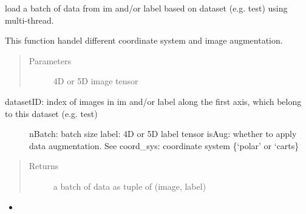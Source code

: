 \documentclass[letterpaper,10pt,english]{sphinxmanual}
\begin{document}

\begin{fulllineitems}
\label{\detokenize{index:util.load_batch.load_batch_parallel}}
load a batch of data from im and/or label based on dataset (e.g. test) using multi-thread.

This function handel different coordinate system and image augmentation.
\begin{quote}\begin{description}
\item[{Parameters}] \leavevmode
{} \textendash{} 4D or 5D image tensor

\end{description}\end{quote}
\begin{description}
\item[{datasetID: index of images in im and/or label along the first axis, which belong to this dataset (e.g.  test)}] \leavevmode
nBatch: batch size
label: 4D or 5D label tensor
isAug: whether to apply data augmentation. See {\hyperref[\detokenize{index:util.load_batch.img_aug}]{}}
coord\_sys: coordinate system \{‘polar’ or ‘carts\}

\end{description}
\begin{quote}\begin{description}
\item[{Returns}] \leavevmode
a batch of data as tuple of (image, label)

\end{description}\end{quote}



\begin{itemize}
\item {} 
{\hyperref[\detokenize{index:util.load_batch.load_batch}]{}}

\end{itemize}



\end{fulllineitems}
\end{document}
